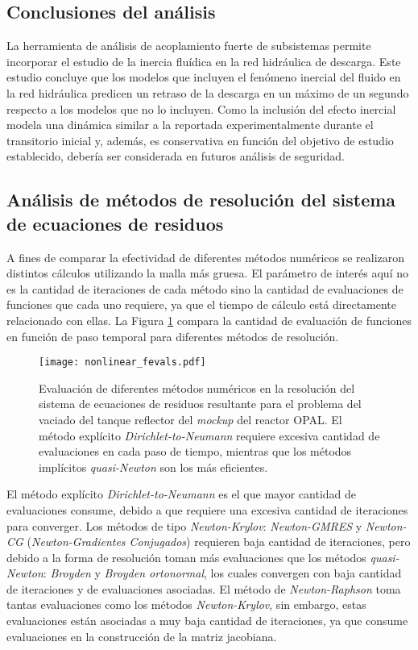 \subsection*{Conclusiones del análisis}
La herramienta de análisis de acoplamiento fuerte de subsistemas permite incorporar el estudio de la inercia fluídica en la red hidráulica de descarga.
Este estudio concluye que los modelos que incluyen el fenómeno inercial del fluido en la red hidráulica predicen un retraso de la descarga en un máximo de un segundo 
respecto a los modelos que no lo incluyen.
Como la inclusión del efecto inercial modela una dinámica similar a la reportada experimentalmente durante el transitorio inicial y,
además, es conservativa en función del objetivo de estudio establecido, debería ser considerada en futuros análisis de seguridad.

\subsection*{Análisis de métodos de resolución del sistema de ecuaciones de residuos}

A fines de comparar la efectividad de diferentes métodos numéricos se realizaron distintos cálculos utilizando la malla más gruesa.
El parámetro de interés aquí no es la cantidad de iteraciones de cada método sino la cantidad de evaluaciones de funciones que cada uno requiere,
ya que el tiempo de cálculo está directamente relacionado con ellas.
La Figura \ref{nonlinear_fevals} compara la cantidad de evaluación de funciones en función de paso temporal para diferentes métodos de resolución.

\begin{figure}[ht]
\centering
\texttt{[image: nonlinear\_fevals.pdf]}
\caption[Evaluación de diferentes métodos numéricos no lineales en el problema del vaciado del tanque reflector del \textit{mockup} del reactor OPAL]
{Evaluación de diferentes métodos numéricos en la resolución del sistema de ecuaciones de residuos resultante para el problema del vaciado del tanque reflector del \textit{mockup} del reactor OPAL.
El método explícito \textit{Dirichlet-to-Neumann} requiere excesiva cantidad de evaluaciones en cada paso de tiempo,
mientras que los métodos implícitos \textit{quasi-Newton} son los más eficientes.}
\label{nonlinear_fevals}
\end{figure}

El método explícito \textit{Dirichlet-to-Neumann} es el que mayor cantidad de evaluaciones consume, debido a que requiere una excesiva cantidad de iteraciones para converger.
Los métodos de tipo \textit{Newton-Krylov}: \textit{Newton-GMRES} y \textit{Newton-CG} (\textit{Newton-Gradientes Conjugados}) requieren baja cantidad de iteraciones, 
pero debido a la forma de resolución toman más evaluaciones que los métodos \textit{quasi-Newton}: \textit{Broyden} y \textit{Broyden ortonormal},
los cuales convergen con baja cantidad de iteraciones y de evaluaciones asociadas.
El método de \textit{Newton-Raphson} toma tantas evaluaciones como los métodos \textit{Newton-Krylov},
sin embargo, estas evaluaciones están asociadas a muy baja cantidad de iteraciones,
ya que consume evaluaciones en la construcción de la matriz jacobiana.

